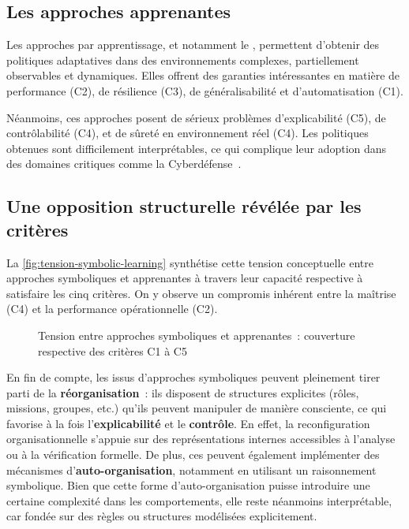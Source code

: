 \subsection{Les approches apprenantes}

Les approches par apprentissage, et notamment le , permettent d'obtenir des politiques adaptatives dans des environnements complexes, partiellement observables et dynamiques. Elles offrent des garanties intéressantes en matière de performance (C2), de résilience (C3), de généralisabilité et d'automatisation (C1).

Néanmoins, ces approches posent de sérieux problèmes d'explicabilité (C5), de contrôlabilité (C4), et de sûreté en environnement réel (C4). Les politiques obtenues sont difficilement interprétables, ce qui complique leur adoption dans des domaines critiques comme la Cyberdéfense~\cite{Gunning2019}.

\subsection{Une opposition structurelle révélée par les critères}

La \autoref{fig:tension-symbolic-learning} synthétise cette tension conceptuelle entre approches symboliques et apprenantes à travers leur capacité respective à satisfaire les cinq critères. On y observe un compromis inhérent entre la maîtrise (C4) et la performance opérationnelle (C2).

\begin{figure}[H]
  \centering
  \resizebox{\textwidth}{!}{%
    
  }
  \caption{Tension entre approches symboliques et apprenantes~: couverture respective des critères C1 à C5}
  \label{fig:tension-symbolic-learning}
\end{figure}

En fin de compte, les  issus d'approches symboliques peuvent pleinement tirer parti de la \textbf{réorganisation}~: ils disposent de structures explicites (rôles, missions, groupes, etc.) qu'ils peuvent manipuler de manière consciente, ce qui favorise à la fois l'\textbf{explicabilité} et le \textbf{contrôle}. En effet, la reconfiguration organisationnelle s'appuie sur des représentations internes accessibles à l'analyse ou à la vérification formelle. De plus, ces  peuvent également implémenter des mécanismes d'\textbf{auto-organisation}, notamment en utilisant un raisonnement symbolique. Bien que cette forme d'auto-organisation puisse introduire une certaine complexité dans les comportements, elle reste néanmoins interprétable, car fondée sur des règles ou structures modélisées explicitement.

